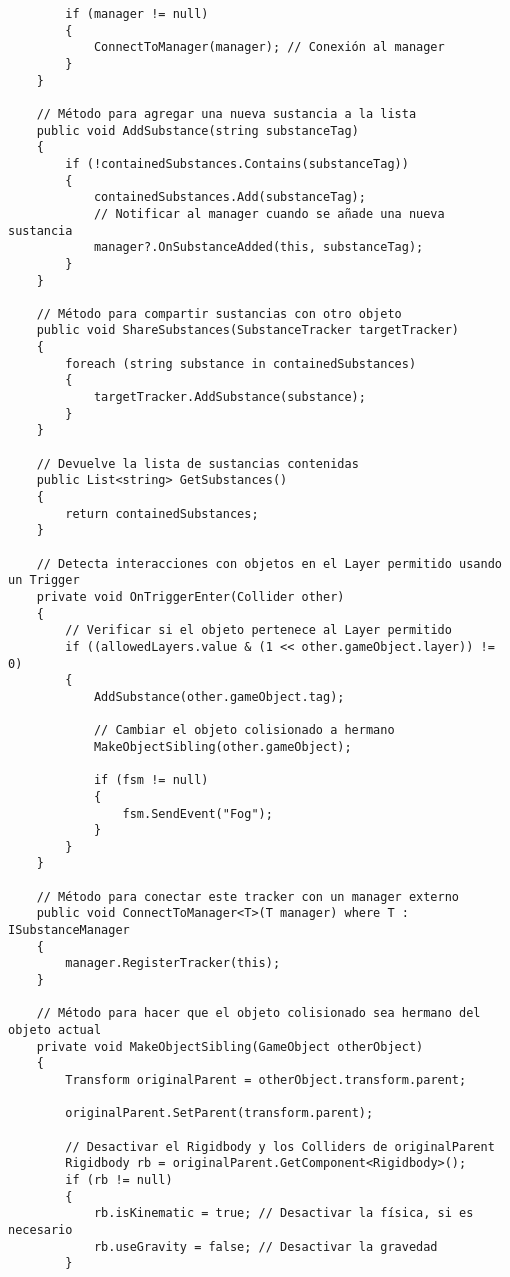 \begin{verbatim}
        if (manager != null)
        {
            ConnectToManager(manager); // Conexión al manager
        }
    }

    // Método para agregar una nueva sustancia a la lista
    public void AddSubstance(string substanceTag)
    {
        if (!containedSubstances.Contains(substanceTag))
        {
            containedSubstances.Add(substanceTag);
            // Notificar al manager cuando se añade una nueva sustancia
            manager?.OnSubstanceAdded(this, substanceTag);
        }
    }

    // Método para compartir sustancias con otro objeto
    public void ShareSubstances(SubstanceTracker targetTracker)
    {
        foreach (string substance in containedSubstances)
        {
            targetTracker.AddSubstance(substance);
        }
    }

    // Devuelve la lista de sustancias contenidas
    public List<string> GetSubstances()
    {
        return containedSubstances;
    }

    // Detecta interacciones con objetos en el Layer permitido usando un Trigger
    private void OnTriggerEnter(Collider other)
    {
        // Verificar si el objeto pertenece al Layer permitido
        if ((allowedLayers.value & (1 << other.gameObject.layer)) != 0)
        {
            AddSubstance(other.gameObject.tag);

            // Cambiar el objeto colisionado a hermano
            MakeObjectSibling(other.gameObject);

            if (fsm != null)
            {
                fsm.SendEvent("Fog");
            }
        }
    }

    // Método para conectar este tracker con un manager externo
    public void ConnectToManager<T>(T manager) where T : ISubstanceManager
    {
        manager.RegisterTracker(this);
    }

    // Método para hacer que el objeto colisionado sea hermano del objeto actual
    private void MakeObjectSibling(GameObject otherObject)
    {
        Transform originalParent = otherObject.transform.parent;

        originalParent.SetParent(transform.parent);

        // Desactivar el Rigidbody y los Colliders de originalParent
        Rigidbody rb = originalParent.GetComponent<Rigidbody>();
        if (rb != null)
        {
            rb.isKinematic = true; // Desactivar la física, si es necesario
            rb.useGravity = false; // Desactivar la gravedad
        }


\end{verbatim}
